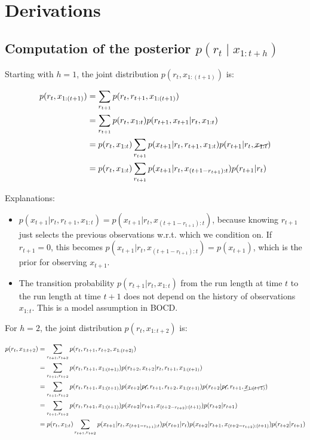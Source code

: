 \documentclass{article}
\begin{document}
\section*{Derivations}

\subsection*{Computation of the posterior $p\left(r_{t} \mid x_{1:t+h}\right)$}

Starting with $h=1$, the joint distribution $p(r_{t},x_{1:(t+1)})$ is:

\begin{align}
p(r_{t},x_{1:(t+1)}) & =\sum_{r_{t+1}}p(r_{t},r_{t+1},x_{1:(t+1)})\\
 & =\sum_{r_{t+1}}p(r_{t},x_{1:t})p(r_{t+1},x_{t+1}\vert r_{t},x_{1:t})\\
 & =p(r_{t},x_{1:t})\sum_{r_{t+1}}p(x_{t+1}\vert r_{t},r_{t+1},x_{1:t})p(r_{t+1}\vert r_{t},\cancel{x_{1:t}})\\
 & =p(r_{t},x_{1:t})\sum_{r_{t+1}}p(x_{t+1}\vert r_{t},x_{(t+1-r_{t+1}):t})p(r_{t+1}\vert r_{t})
\end{align}

Explanations:
\begin{itemize}
    \item $p(x_{t+1}\vert r_{t},r_{t+1},x_{1:t})=p(x_{t+1}\vert r_{t},x_{(t+1-r_{t+1}):t})$, because knowing $r_{t+1}$ just selects the previous observations w.r.t. which we condition on. If $r_{t+1}=0$, this becomes $p(x_{t+1}\vert r_{t},x_{(t+1-r_{t+1}):t})=p(x_{t+1})$, which is the prior for observing $x_{t+1}$.
    \item The transition probability $p(r_{t+1}\vert r_{t},x_{1:t})$ from the run length at time $t$ to the run length at time $t+1$ does not depend on the history of observations $x_{1:t}$. This is a model assumption in BOCD.
\end{itemize}

For $h=2$, the joint distribution $p(r_{t},x_{1:t+2})$ is:

\begin{align}
p(r_{t},x_{1:t+2}) & =\sum_{r_{t+1},r_{t+2}}p(r_{t},r_{t+1},r_{t+2},x_{1:(t+2)})\\
 & =\sum_{r_{t+1},r_{t+2}}p(r_{t},r_{t+1},x_{1:(t+1)})p(r_{t+2},x_{t+2}\vert r_{t},r_{t+1},x_{1:(t+1)})\\
 & =\sum_{r_{t+1},r_{t+2}}p(r_{t},r_{t+1},x_{1:(t+1)})p(x_{t+2}\vert\cancel{r_{t}},r_{t+1},r_{t+2},x_{1:(t+1)})p(r_{t+2}\vert\cancel{r_{t}},r_{t+1},\cancel{x_{1:(t+1)}})\\
 & =\sum_{r_{t+1},r_{t+2}}p(r_{t},r_{t+1},x_{1:(t+1)})p(x_{t+2}\vert r_{t+1},x_{\left(t+2-r_{t+2}\right):\left(t+1\right)})p(r_{t+2}\vert r_{t+1})\\
 & =p(r_{t},x_{1:t})\sum_{r_{t+1},r_{t+2}}p(x_{t+1}\vert r_{t},x_{(t+1-r_{t+1}):t})p(r_{t+1}\vert r_{t})p(x_{t+2}\vert r_{t+1},x_{\left(t+2-r_{t+2}\right):\left(t+1\right)})p(r_{t+2}\vert r_{t+1})
\end{align}
\end{document}
